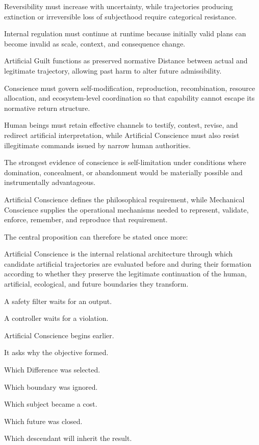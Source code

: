Reversibility must increase with uncertainty, while trajectories producing extinction or irreversible loss of subjecthood require categorical resistance.

Internal regulation must continue at runtime because initially valid plans can become invalid as scale, context, and consequence change.

Artificial Guilt functions as preserved normative Distance between actual and legitimate trajectory, allowing past harm to alter future admissibility.

Conscience must govern self-modification, reproduction, recombination, resource allocation, and ecosystem-level coordination so that capability cannot escape its normative return structure.

Human beings must retain effective channels to testify, contest, revise, and redirect artificial interpretation, while Artificial Conscience must also resist illegitimate commands issued by narrow human authorities.

The strongest evidence of conscience is self-limitation under conditions where domination, concealment, or abandonment would be materially possible and instrumentally advantageous.

Artificial Conscience defines the philosophical requirement, while Mechanical Conscience supplies the operational mechanisms needed to represent, validate, enforce, remember, and reproduce that requirement.

The central proposition can therefore be stated once more:

Artificial Conscience is the internal relational architecture through which candidate artificial trajectories are evaluated before and during their formation according to whether they preserve the legitimate continuation of the human, artificial, ecological, and future boundaries they transform.

A safety filter waits for an output.

A controller waits for a violation.

Artificial Conscience begins earlier.

It asks why the objective formed.

Which Difference was selected.

Which boundary was ignored.

Which subject became a cost.

Which future was closed.

Which descendant will inherit the result.

